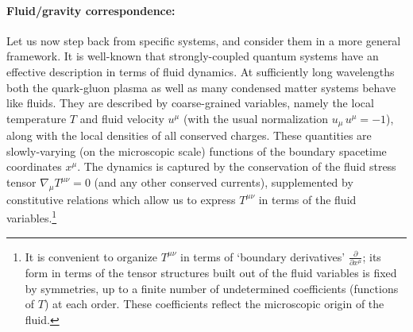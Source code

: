 \documentclass[12pt]{article}
\begin{document}
\paragraph{Fluid/gravity correspondence:}  %
Let us now step back from specific systems, and consider them in a more general framework.
It is well-known that strongly-coupled quantum systems have an effective description in terms of fluid dynamics.  At sufficiently long wavelengths both the quark-gluon plasma as well as many condensed matter systems  behave like fluids.  They are described by coarse-grained variables, namely the local temperature $T$ and fluid velocity $u^\mu$ (with the usual normalization $u_\mu \, u^\mu = -1$), along with the local densities of all conserved charges.  These quantities are slowly-varying (on the microscopic scale) functions of the boundary spacetime coordinates $x^\mu$.
The dynamics is captured by the conservation of the fluid stress tensor $\nabla_\mu T^{\mu\nu} = 0$ (and any other conserved currents), supplemented by constitutive relations which allow us to express $T^{\mu\nu}$ in terms of the fluid variables.\footnote{
It is convenient to organize $T^{\mu\nu}$ in terms of `boundary derivatives' $\frac{\partial }{\partial x^\mu}$; its form in terms of the tensor structures built out of the fluid variables is fixed by symmetries, up to a finite number of undetermined coefficients (functions of $T$) at each order.  These coefficients reflect the microscopic origin of the fluid.}
\end{document}
